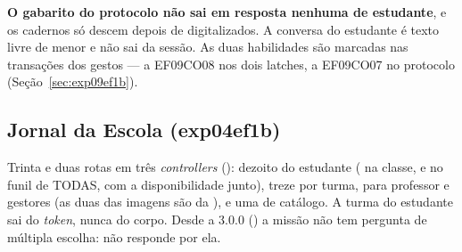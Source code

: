 \begin{regra}
\textbf{O gabarito do protocolo não sai em resposta nenhuma de estudante}, e
os cadernos só descem depois de digitalizados. A conversa do estudante é
texto livre de menor e não sai da sessão. As duas habilidades são marcadas
nas transações dos gestos --- a EF09CO08 nos dois latches, a EF09CO07 no
protocolo (Seção~\ref{sec:exp09ef1b}).
\end{regra}

\subsection{Jornal da Escola (exp04ef1b)}
\label{sec:api-jornal-escola}


Trinta e duas rotas em três \emph{controllers} (): dezoito do
estudante ( na classe, e  no
funil  de TODAS, com a disponibilidade junto), treze por turma,
para professor e gestores (as duas das imagens são da ), e uma de
catálogo. A turma do estudante sai do
\emph{token}, nunca do corpo. Desde a 3.0.0 () a missão não tem
pergunta de múltipla escolha:  não
responde por ela.

